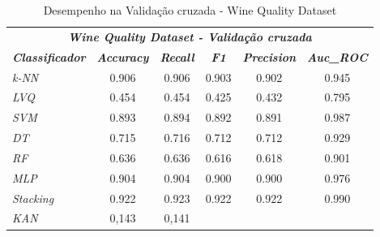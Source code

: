 \documentclass[journal]{IEEEtran}
\begin{document}
\begin{table}[h!]
	\caption{Desempenho na Validação cruzada - Wine Quality Dataset}
	\label{tab:6}
	\begin{threeparttable}
		\begin{tabular}{lccccc}
			\hline
			\multicolumn{6}{c}{\textit{\textbf{Wine Quality Dataset - Validação cruzada}}}                                                                                                                         \\
			\multicolumn{1}{l|}{\textit{\textbf{Classificador}}} & \textit{\textbf{Accuracy}} & \textit{\textbf{Recall}}   & \textit{\textbf{F1}}       & \textit{\textbf{Precision}} & \textit{\textbf{Auc\_ROC}} \\ \hline
			\multicolumn{1}{l|}{\textit{k-NN}}                   & 0.906                      & 0.906                      & 0.903                      & 0.902                       & 0.945                      \\
			\multicolumn{1}{l|}{\textit{LVQ}}                    & 0.454                      & 0.454                      & 0.425                      & 0.432                       & 0.795                      \\
			\multicolumn{1}{l|}{\textit{SVM}}                    & 0.893                      & 0.894                      & 0.892                      & 0.891                       & 0.987                      \\
			\multicolumn{1}{l|}{\textit{DT}}                     & 0.715                      & 0.716                      & 0.712                      & 0.712                       & 0.929                      \\
			\multicolumn{1}{l|}{\textit{RF}}                     & 0.636                      & 0.636                      & 0.616                      & 0.618                       & 0.901                      \\
			\multicolumn{1}{l|}{\textit{MLP}}                    & 0.904                      & 0.904                      & 0.900                      & 0.900                       & 0.976                      \\
			\multicolumn{1}{l|}{\textit{Stacking}}               & \cellcolor{lightgray}0.922 & \cellcolor{lightgray}0.923 & \cellcolor{lightgray}0.922 & \cellcolor{lightgray}0.922  & \cellcolor{lightgray}0.990 \\
			\multicolumn{1}{l|}{\textit{KAN}}                    & 0,143
			                                                     & 0,141

\end{tabular}
\end{threeparttable}
\end{table}
\end{document}
